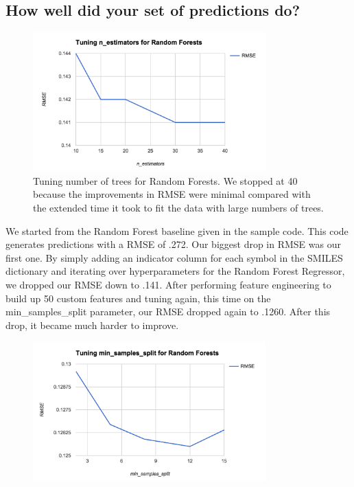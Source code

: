 \documentclass[]{article}
\begin{document}
\subsection*{How well did your set of predictions do?}
\begin{flushleft}
	\begin{figure}[h]
		\centering
		\includegraphics[width=0.8\textwidth]{n_estimators}
		\caption{Tuning number of trees for Random Forests.  We stopped at 40 because the improvements in RMSE were minimal compared with the extended time it took to fit the data with large numbers of trees.}
	\end{figure}
	We started from the Random Forest baseline given in the sample code.  This code generates predictions with a RMSE of .272.  Our biggest drop in RMSE was our first one.  By simply adding an indicator column for each symbol in the SMILES dictionary and iterating over hyperparameters for the Random Forest Regressor, we dropped our RMSE down to .141.
	\newline\newline
	After performing feature engineering to build up 50 custom features and tuning again, this time on the min\_samples\_split parameter, our RMSE dropped again to .1260. After this drop, it became much harder to improve. 
	\newline\newline
	\begin{figure}[h]
		\centering
		\includegraphics[width=0.8\textwidth]{min_samples_split}

\end{figure}
\end{flushleft}
\end{document}
